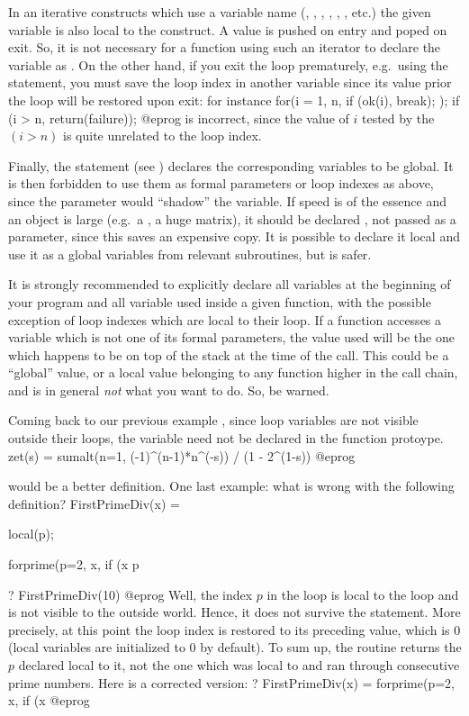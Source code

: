 In an iterative constructs which use a variable name (,
, , , , ,
etc.) the given variable is also local to the construct. A value is pushed on
entry and poped on exit. So, it is not necessary for a function using such an
iterator to declare the variable as . On the other hand, if you
exit the loop prematurely, e.g.~using the  statement, you must
save the loop index in another variable since its value prior the loop will
be restored upon exit: for instance
\bprog
  for(i = 1, n,
    if (ok(i), break);
  );
  if (i > n, return(failure));
@eprog
\noindent is incorrect, since the value of $i$ tested by the $(i > n)$ is quite
unrelated to the loop index.

Finally, the statement  (see
) declares the corresponding variables to be global. It is
then forbidden to use them as formal parameters or loop indexes as above,
since the parameter would ``shadow'' the variable. If speed is of the essence
and an object is large (e.g.~a , a huge matrix), it should be
declared , not passed as a parameter, since this saves an
expensive copy. It is possible to declare it local and use it as a global
variables from relevant subroutines, but  is safer.

It is strongly recommended to explicitly declare all  variables
at the beginning of your program and all  variable used inside a
given function, with the possible exception of loop indexes which are local
to their loop. If a function accesses a variable which is not one of its
formal parameters, the value used will be the one which happens to be on top
of the stack at the time of the call. This could be a ``global'' value, or a
local value belonging to any function higher in the call chain, and is in
general \emph{not} what you want to do. So, be warned.


Coming back to our previous example , since loop variables are not
visible outside their loops, the variable  need not be declared in the
function protoype.
\bprog
zet(s) = sumalt(n=1, (-1)^(n-1)*n^(-s)) / (1 - 2^(1-s))
@eprog

\noindent would be a better definition. One last example: what is
wrong with the following definition?
\bprog
FirstPrimeDiv(x) =
{ local(p);

  forprime(p=2, x, if (x%
  p
}
? FirstPrimeDiv(10)
@eprog
\noindent Well, the index $p$ in the  loop is local to
the loop and is not visible to the outside world. Hence, it does not survive
the  statement. More precisely, at this point the loop index is
restored to its preceding value, which is 0 (local variables are
initialized to 0 by default). To sum up, the routine returns the $p$
declared local to it, not the one which was local to  and ran
through consecutive prime numbers. Here is a corrected version:
\bprog
? FirstPrimeDiv(x) = forprime(p=2, x, if (x%
@eprog


